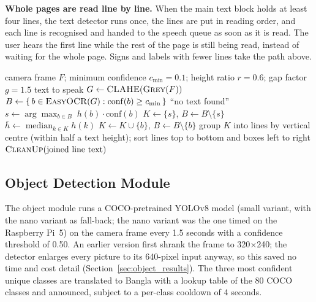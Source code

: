 \textbf{Whole pages are read line by line.} When the main text block holds at least four lines, the text detector runs once, the lines are put in reading order, and each line is recognised and handed to the speech queue as soon as it is read. The user hears the first line while the rest of the page is still being read, instead of waiting for the whole page. Signs and labels with fewer lines take the path above.

\begin{algorithm}[!htbp]
\caption{Text reading with the main text block (pipeline v2)}
\label{alg:ocr}
\begin{algorithmic}[1]
\Require camera frame $F$; minimum confidence $c_{\min}=0.1$; height ratio $r=0.6$; gap factor $g=1.5$
\Ensure text to speak
\State $G \gets \textsc{CLAHE}(\textsc{Grey}(F))$ 
\State $B \gets \{\,b \in \textsc{EasyOCR}(G) : \mathrm{conf}(b) \ge c_{\min}\,\}$ 
 \State \Return ``no text found'' \EndIf
\State $s \gets \arg\max_{b \in B}\; h(b)\cdot \mathrm{conf}(b)$ 
\State $K \gets \{s\}$, \; $B \gets B \setminus \{s\}$
\Repeat {}
  \State $\bar h \gets \operatorname{median}_{k \in K} h(k)$
      \State $K \gets K \cup \{b\}$, \; $B \gets B \setminus \{b\}$
    \EndIf
  \EndFor
{}
\State group $K$ into lines by vertical centre (within half a text height); sort lines top to bottom and boxes left to right
\State \Return $\textsc{CleanUp}(\text{joined line text})$ 
\end{algorithmic}
\end{algorithm}


\subsection{Object Detection Module}
The object module runs a COCO-pretrained YOLOv8 model (small variant, with the nano variant as fall-back; the nano variant was the one timed on the Raspberry Pi~5) on the camera frame every 1.5 seconds with a confidence threshold of 0.50. An earlier version first shrank the frame to 320$\times$240; the detector enlarges every picture to its 640-pixel input anyway, so this saved no time and cost detail (Section~\ref{sec:object_results}). The three most confident unique classes are translated to Bangla with a lookup table of the 80 COCO classes and announced, subject to a per-class cooldown of 4 seconds.

